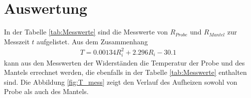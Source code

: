 \section{Auswertung}
\label{sec:Auswertung}

In der Tabelle \ref{tab:Messwerte} sind die Messwerte von
$R_{Probe}$ und $R_{Mantel}$ zur Messzeit $t$ aufgelistet.
Aus dem Zusammenhang
\begin{align}
  T=\num{0.00134} R_i^2 + \num{2.296} R_i - \num{30.1} \label{eqn:inKelvin}
\end{align}
kann aus den Messwerten der Widerständen
die Temperatur der Probe und
des Mantels errechnet werden, die ebenfalls in der
Tabelle \ref{tab:Messwerte} enthalten sind.
Die Abbildung \ref{fig:T_mess} zeigt den
Verlauf des Aufheizen sowohl von Probe
als auch des Mantels.



